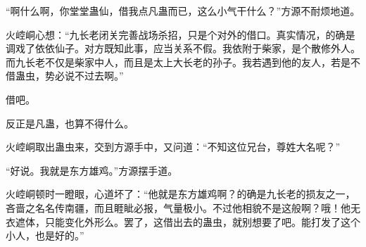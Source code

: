 \begin{this_body}
“啊什么啊，你堂堂蛊仙，借我点凡蛊而已，这么小气干什么？”方源不耐烦地道。

火崆峒心想：“九长老闭关完善战场杀招，只是个对外的借口。真实情况，的确是调戏了依依仙子。对方既知此事，应当关系不假。我依附于柴家，是个散修外人。而九长老不仅是柴家中人，而且是太上大长老的孙子。我若遇到他的友人，若是不借蛊虫，势必说不过去啊。”

借吧。

反正是凡蛊，也算不得什么。

火崆峒取出蛊虫来，交到方源手中，又问道：“不知这位兄台，尊姓大名呢？”

“好说。我就是东方雄鸡。”方源摆手道。

火崆峒顿时一瞪眼，心道坏了：“他就是东方雄鸡啊？的确是九长老的损友之一，吝啬之名名传南疆，而且睚眦必报，气量极小。不过他相貌不是这般啊？哦！他无衣遮体，只能变化外形么。罢了，这借出去的蛊虫，就别想要了吧。能打发了这个小人，也是好的。”

\end{this_body}

